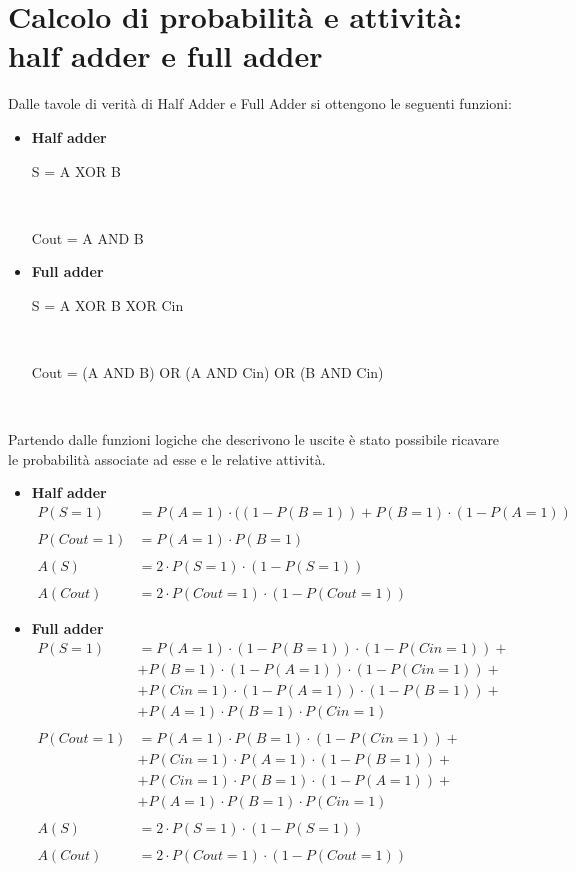 \documentclass[11pt,  english, makeidx, a4paper, titlepage, oneside]{book}
\begin{document}
\section{Calcolo di probabilità e attività: half adder e full adder} 
Dalle tavole di verità di Half Adder e Full Adder si ottengono le seguenti funzioni:
\begin{itemize}
	\item \textbf{Half adder} \\
	\centerline{S = A XOR B} \\
	\centerline{Cout = A AND B}
	\item \textbf{Full adder} \\
	\centerline{S = A XOR B XOR Cin} \\
	\centerline{Cout = (A AND B) OR (A AND Cin) OR (B AND Cin)}\\
\end{itemize}
Partendo dalle funzioni logiche che descrivono le uscite è stato possibile ricavare le probabilità
associate ad esse e le relative attività.
\begin{itemize}
	\item \textbf{Half adder}\\
	\begin{align*}
	P(S=1) &= P(A=1) \cdot ((1-P(B=1)) + P(B=1) \cdot (1-P(A=1))\\\\
	P(Cout=1) & = P(A=1) \cdot P(B=1)\\\\
	A(S) &= 2 \cdot P(S=1) \cdot (1-P(S=1))\\\\
    A(Cout) &= 2 \cdot P(Cout=1) \cdot (1-P(Cout=1)) 
    \end{align*}	
	\item \textbf{Full adder}
	\begin{align*}
	P(S=1) & = P(A=1) \cdot(1-P(B=1)) \cdot (1-P(Cin=1)) + \\ 
	          & + P(B=1) \cdot(1-P(A=1)) \cdot (1-P(Cin=1)) + \\
	          & + P(Cin=1) \cdot (1-P(A=1)) \cdot(1-P(B=1)) + \\
	          & + P(A=1) \cdot P(B=1) \cdot P(Cin=1)\\\\
	 P(Cout=1) & = P(A=1) \cdot P(B=1) \cdot (1-P(Cin=1)) +\\
	 					& + P(Cin=1) \cdot P(A=1) \cdot (1-P(B=1)) +\\
	 					& + P(Cin=1) \cdot P(B=1) \cdot (1-P(A=1)) +\\
	 					& + P(A=1) \cdot P(B=1) \cdot P(Cin=1)\\\\
	 A(S) & = 2 \cdot P(S=1) \cdot (1-P(S=1))\\\\
	A(Cout) & = 2 \cdot P(Cout=1) \cdot (1-P(Cout=1))
	\end{align*}	
\end{itemize} 
\end{document}
